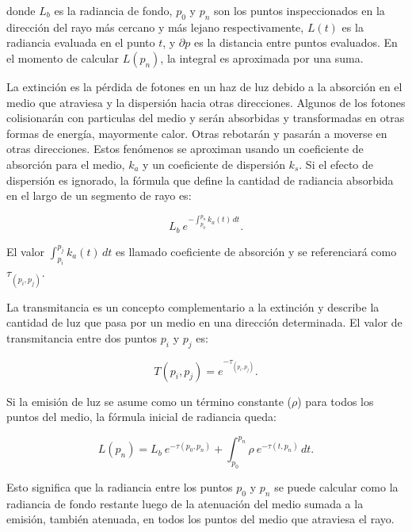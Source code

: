 \documentclass[spanish,a4paper,11pt,oneside,links]{report}
\begin{document}
\noindent donde $L_b$ es la radiancia de fondo, $p_0$ y $p_n$ son los puntos inspeccionados en la dirección del rayo más cercano y más lejano respectivamente, $L(t)$ es la radiancia evaluada en el punto $t$, y $\partial p$ es la distancia entre puntos evaluados. En el momento de calcular $L(p_n)$, la integral es aproximada por una suma.

La extinción es la pérdida de fotones en un haz de luz debido a la absorción en el medio que atraviesa y la dispersión hacia otras direcciones. Algunos de los fotones colisionarán con particulas del medio y serán absorbidas y transformadas en otras formas de energía, mayormente calor. Otras rebotarán y pasarán a moverse en otras direcciones. Estos fenómenos se aproximan usando un coeficiente de absorción para el medio, $k_a$ y un coeficiente de dispersión $k_s$. Si el efecto de dispersión es ignorado, la fórmula que define la cantidad de radiancia absorbida en el largo de un segmento de rayo
es: 

\begin{equation} \label{eq:radiance_absorption}  
    L_b \ e^{- \textstyle  \int_{p_0}^{p_n} k_a(t) \, dt}.
\end{equation}

El valor $\int_{p_i}^{p_j} k_a(t) \, dt$ es llamado coeficiente de absorción y se referenciar\'a como $\tau_{(p_i, p_j)}$.

La transmitancia es un concepto complementario a la extinción y describe la cantidad de luz que pasa por un medio en una dirección determinada. El valor de transmitancia entre dos puntos $p_i$ y $p_j$
es:

\begin{equation} \label{eq:general_radiance}  
  T(p_i,p_j) = e^{- \textstyle \tau_{(p_i, p_j)}}.
\end{equation}

Si la emisión de luz se asume como un término constante ($\rho$) para todos los puntos del medio, la fórmula inicial de radiancia queda:

\begin{equation} \label{eq:ray_radiance}  
  L(p_n) = L_b \ e^{-\tau(p_0, p_n)} + \int_{p_0}^{p_n} \rho \ e^{-\tau(t,p_n)} \, dt.
\end{equation}

Esto significa que la radiancia entre los puntos $p_0$ y $p_n$ se puede calcular como la radiancia de fondo restante luego de la atenuación del medio sumada a la emisión, también atenuada, en todos los puntos del medio que atraviesa el rayo.
\end{document}
